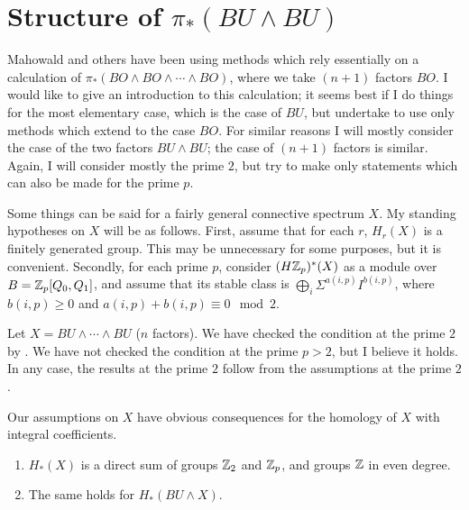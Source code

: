 \documentclass[../main]{subfiles}
\begin{document}
\chapter{Structure of $\pi_*({BU}\wedge {BU})$}
\label{sec:p3c17}
Mahowald and others have been using methods which rely essentially on a calculation of $\pi_*({BO}\wedge{BO}\wedge\cdots\wedge{BO})$, where we take $(n+1)$ factors ${BO}$. I would like to give an introduction to this calculation; it seems best if I do things for the most elementary case, which is the case of ${BU}$, but undertake to use only methods which extend to the case ${BO}$. For similar reasons I will mostly consider the case of the two factors ${BU}\wedge{BU}$; the case of $(n+1)$ factors is similar. Again, I will consider mostly the prime $2$, but try to make only statements which can also be made for the prime $p$.

Some things can be said for a fairly general connective spectrum $X$.
My standing hypotheses on $X$ will be as follows. First, assume that for each $r$, $H_r(X)$ is a finitely generated group. This may be unnecessary for some purposes, but it is convenient. Secondly, for each prime $p$, consider $(H\mathbb{Z}_p)^*(X)$ as a module over $B = \mathbb{Z}_p[Q_0,Q_1]$, and assume that its stable class is $\bigoplus_i\Sigma^{a(i,p)}I^{b(i,p)}$, where $b(i,p) \ge 0$ and $a(i,p) + b(i,p) \equiv 0 \mod 2$.

\begin{examples}
Let $X = {BU}\wedge\cdots\wedge{BU}$ ($n$ factors). We have checked the condition at the prime $2$ by . We have not checked the condition at the prime $p>2$, but I believe it holds. In any case, the results at the
prime $2$ follow from the assumptions at the prime $2$.
\end{examples}

Our assumptions on $X$ have obvious consequences for the homology
of $X$ with integral coefficients.

\begin{lemma} \label{lem:p3c17.1}
    \begin{enumerate}
    \item $H_*(X)$ is a direct sum of groups $\mathbb{Z}_2$ and $\mathbb{Z}_p$, and groups $\mathbb{Z}$ in even degree.
    \item The same holds for $H_*({BU}\wedge X)$.
    \end{enumerate}
\end{lemma}
\end{document}
